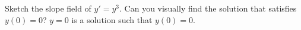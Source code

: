 {Sketch the slope field of $y'=y^3$.  Can you visually find the solution
that satisfies $y(0)=0$?}
{
$y=0$ is a solution such that $y(0)=0$.\\
}